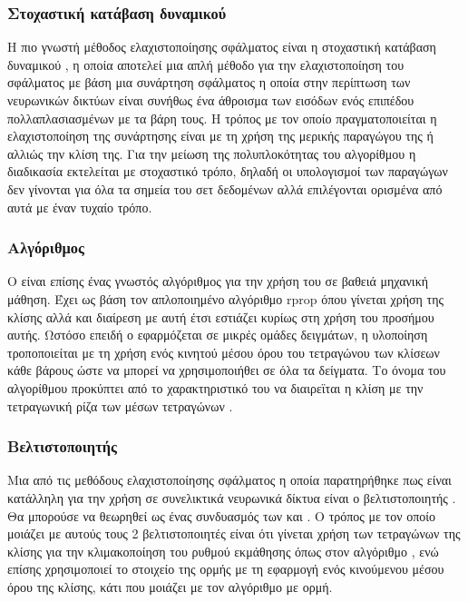 \subsubsection{Στοχαστική κατάβαση δυναμικού }
Η πιο γνωστή μέθοδος ελαχιστοποίησης σφάλματος είναι η στοχαστική κατάβαση δυναμικού , η οποία αποτελεί μια απλή μέθοδο για την ελαχιστοποίηση του σφάλματος με βάση μια συνάρτηση σφάλματος η οποία στην περίπτωση των νευρωνικών δικτύων είναι συνήθως ένα άθροισμα των εισόδων ενός επιπέδου πολλαπλασιασμένων με τα βάρη τους. Η τρόπος με τον οποίο πραγματοποιείται η ελαχιστοποίηση της συνάρτησης είναι με τη χρήση της μερικής παραγώγου της ή αλλιώς την κλίση της. Για την μείωση της πολυπλοκότητας του αλγορίθμου η διαδικασία εκτελείται με στοχαστικό τρόπο, δηλαδή οι υπολογισμοί των παραγώγων δεν γίνονται για όλα τα σημεία του σετ δεδομένων αλλά επιλέγονται ορισμένα από αυτά με έναν τυχαίο τρόπο.
\subsubsection{Αλγόριθμος }
Ο  είναι επίσης ένας γνωστός αλγόριθμος για την χρήση του σε βαθειά μηχανική μάθηση. Έχει ως βάση τον απλοποιημένο αλγόριθμο rprop όπου γίνεται χρήση της κλίσης αλλά και διαίρεση με αυτή έτσι εστιάζει κυρίως στη χρήση του προσήμου αυτής. Ωστόσο επειδή ο  εφαρμόζεται σε μικρές ομάδες δειγμάτων, η υλοποίηση τροποποιείται με τη χρήση ενός κινητού μέσου όρου του τετραγώνου των κλίσεων κάθε βάρους ώστε να μπορεί να χρησιμοποιήθει σε όλα τα δείγματα. Το όνομα του αλγορίθμου προκύπτει από το χαρακτηριστικό του να διαιρεϊται η κλίση με την τετραγωνική ρίζα των μέσων τετραγώνων .
\subsubsection{Βελτιστοποιητής }
Μια από τις μεθόδους ελαχιστοποίησης σφάλματος η οποία παρατηρήθηκε πως είναι κατάλληλη για την χρήση σε συνελικτικά νευρωνικά δίκτυα είναι ο βελτιστοποιητής . Θα μπορούσε να θεωρηθεί ως ένας συνδυασμός των  και . Ο τρόπος με τον οποίο μοιάζει με αυτούς τους 2 βελτιστοποιητές είναι ότι γίνεται χρήση των τετραγώνων της κλίσης για την κλιμακοποίηση του ρυθμού εκμάθησης όπως στον αλγόριθμο , ενώ επίσης χρησιμοποιεί το στοιχείο της ορμής με τη εφαρμογή ενός κινούμενου μέσου όρου της κλίσης, κάτι που μοιάζει με τον αλγόριθμο  με ορμή.\\

